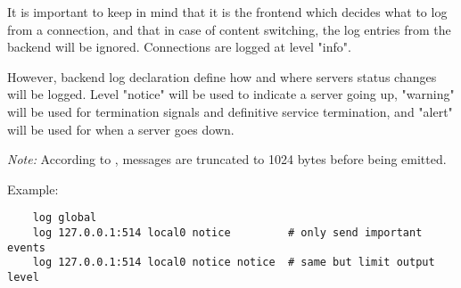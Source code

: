 
  It is important to keep in mind that it is the frontend which decides what to
  log from a connection, and that in case of content switching, the log entries
  from the backend will be ignored. Connections are logged at level "info".

  However, backend log declaration define how and where servers status changes
  will be logged. Level "notice" will be used to indicate a server going up,
  "warning" will be used for termination signals and definitive service
  termination, and "alert" will be used for when a server goes down.

  \emph{Note:} According to , messages are truncated to 1024 bytes before
         being emitted.

  Example:

\begin{verbatim}
    log global
    log 127.0.0.1:514 local0 notice         # only send important events
    log 127.0.0.1:514 local0 notice notice  # same but limit output level
\end{verbatim}

